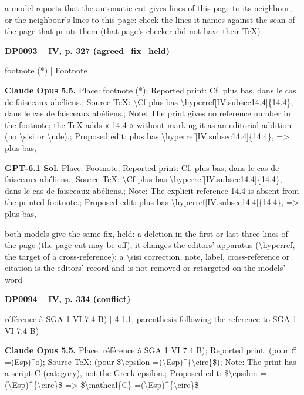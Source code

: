 a model reports that the automatic cut gives lines of this page to its neighbour, or the neighbour's lines to this page: check the lines it names against the scan of the page that prints them (that page's checker did not have their TeX)\par
\par\noindent\hypertarget{DP0093}{}\textbf{DP0093 -- IV, p. 327 (agreed\_fix\_held)}\par
footnote (*) | Footnote\par
\textbf{Claude Opus 5.5.} Place: footnote (*); Reported print: Cf. plus bas, dans le cas de faisceaux abéliens.; Source TeX: \textbackslash{}Cf plus bas \textbackslash{}hyperref[IV.subsec14.4]\{14.4\}, dans le cas de faisceaux abéliens.; Note: The print gives no reference number in the footnote; the TeX adds « 14.4 » without marking it as an editorial addition (no \textbackslash{}sisi or \textbackslash{}nde).; Proposed edit: plus bas \textbackslash{}hyperref[IV.subsec14.4]\{14.4\}, =\allowbreak > plus bas,\par
\textbf{GPT-6.1 Sol.} Place: Footnote; Reported print: Cf. plus bas, dans le cas de faisceaux abéliens.; Source TeX: \textbackslash{}Cf plus bas \textbackslash{}hyperref[IV.subsec14.4]\{14.4\}, dans le cas de faisceaux abéliens.; Note: The explicit reference 14.4 is absent from the printed footnote.; Proposed edit: plus bas \textbackslash{}hyperref[IV.subsec14.4]\{14.4\}, =\allowbreak > plus bas,\par
both models give the same fix, held: a deletion in the first or last three lines of the page (the page cut may be off); it changes the editors' apparatus (\textbackslash{}hyperref, the target of a cross-reference): a \textbackslash{}sisi correction, note, label, cross-reference or citation is the editors' record and is not removed or retargeted on the models' word\par
\par\noindent\hypertarget{DP0094}{}\textbf{DP0094 -- IV, p. 334 (conflict)}\par
référence à SGA 1 VI 7.4 B) | 4.1.1, parenthesis following the reference to SGA 1 VI 7.4 B)\par
\textbf{Claude Opus 5.5.} Place: référence à SGA 1 VI 7.4 B); Reported print: (pour \ensuremath{𝒞} =\allowbreak  (Esp)\textasciicircum{}o); Source TeX: (pour \$\textbackslash{}epsilon =\allowbreak  (\textbackslash{}Esp)\textasciicircum{}\{\textbackslash{}circ\}\$); Note: The print has a script C (category), not the Greek epsilon.; Proposed edit: \$\textbackslash{}epsilon =\allowbreak  (\textbackslash{}Esp)\textasciicircum{}\{\textbackslash{}circ\}\$ =\allowbreak > \$\textbackslash{}mathcal\{C\} =\allowbreak  (\textbackslash{}Esp)\textasciicircum{}\{\textbackslash{}circ\}\$\par

